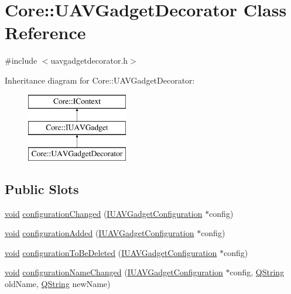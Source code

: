 \hypertarget{class_core_1_1_u_a_v_gadget_decorator}{\section{\-Core\-:\-:\-U\-A\-V\-Gadget\-Decorator \-Class \-Reference}
\label{class_core_1_1_u_a_v_gadget_decorator}
}


{\ttfamily \#include $<$uavgadgetdecorator.\-h$>$}

\-Inheritance diagram for \-Core\-:\-:\-U\-A\-V\-Gadget\-Decorator\-:\begin{figure}[H]
\begin{center}
\leavevmode
\includegraphics[height=3.000000cm]{class_core_1_1_u_a_v_gadget_decorator}
\end{center}
\end{figure}
\subsection*{\-Public \-Slots}
\begin{DoxyCompactItemize}
\item 
\hyperlink{group___u_a_v_objects_plugin_ga444cf2ff3f0ecbe028adce838d373f5c}{void} \hyperlink{group___core_plugin_ga8a003ada3aa27fd0e98e1d91610cd59b}{configuration\-Changed} (\hyperlink{class_core_1_1_i_u_a_v_gadget_configuration}{\-I\-U\-A\-V\-Gadget\-Configuration} $\ast$config)
\item 
\hyperlink{group___u_a_v_objects_plugin_ga444cf2ff3f0ecbe028adce838d373f5c}{void} \hyperlink{group___core_plugin_ga3fcfe36e1ac689138c02cd3945178da0}{configuration\-Added} (\hyperlink{class_core_1_1_i_u_a_v_gadget_configuration}{\-I\-U\-A\-V\-Gadget\-Configuration} $\ast$config)
\item 
\hyperlink{group___u_a_v_objects_plugin_ga444cf2ff3f0ecbe028adce838d373f5c}{void} \hyperlink{group___core_plugin_gae75d3e369cd07b1bc2fe50a2a00264d4}{configuration\-To\-Be\-Deleted} (\hyperlink{class_core_1_1_i_u_a_v_gadget_configuration}{\-I\-U\-A\-V\-Gadget\-Configuration} $\ast$config)
\item 
\hyperlink{group___u_a_v_objects_plugin_ga444cf2ff3f0ecbe028adce838d373f5c}{void} \hyperlink{group___core_plugin_ga5ff52091a4bad5f4e04f09035f7ef9ec}{configuration\-Name\-Changed} (\hyperlink{class_core_1_1_i_u_a_v_gadget_configuration}{\-I\-U\-A\-V\-Gadget\-Configuration} $\ast$config, \hyperlink{group___u_a_v_objects_plugin_gab9d252f49c333c94a72f97ce3105a32d}{\-Q\-String} old\-Name, \hyperlink{group___u_a_v_objects_plugin_gab9d252f49c333c94a72f97ce3105a32d}{\-Q\-String} new\-Name)
\end{DoxyCompactItemize}
